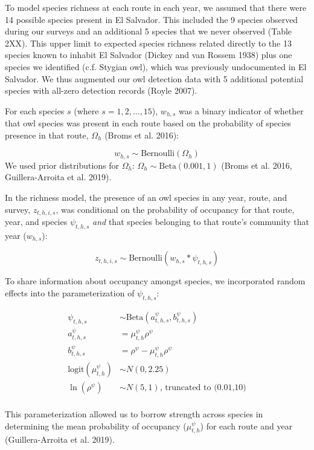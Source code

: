 \documentclass[
]{article}
\begin{document}
To model species richness at each route in each year, we assumed that
there were 14 possible species present in El Salvador. This included the
9 species observed during our surveys and an additional 5 species that
we never observed (Table 2XX). This upper limit to expected species
richness related directly to the 13 species known to inhabit El Salvador
(Dickey and van Rossem 1938) plus one species we identified (c.f.
Stygian owl), which was previously undocumented in El Salvador. We thus
augmented our owl detection data with 5 additional potential species
with all-zero detection records (Royle 2007).

For each species \(s\) (where \(s = 1,2, \ldots,15\)), \(w_{h,s}\) was a
binary indicator of whether that owl species was present in each route
based on the probability of species presence in that route, \(\Omega_h\)
(Broms et al. 2016):

\[
w_{h,s} \sim \text{Bernoulli}(\Omega_h)
\] We used prior distributions for \(\Omega_h\):
\(\Omega_h \sim \text{Beta}(0.001, 1)\) (Broms et al. 2016,
Guillera-Arroita et al. 2019).

In the richness model, the presence of an owl species in any year,
route, and survey, \(z_{t,h,i,s}\), was conditional on the probability
of occupancy for that route, year, and species \(\psi_{t,h,s}\)
\emph{and} that species belonging to that route's community that year
(\(w_{h,s}\)):

\[
z_{t,h,i,s} \sim \text{Bernoulli}(w_{h,s}*\psi_{t,h,s})
\]

To share information about occupancy amongst species, we incorporated
random effects into the parameterization of \(\psi_{t,h,s}\):

\[
\begin{aligned}
\psi_{t,h,s} &\sim \text{Beta}(a^\psi_{t,h,s},b^\psi_{t,h,s})\\ 
a^\psi_{t,h,s} &= \mu^\psi_{t,h}\rho^\psi\\
b^\psi_{t,h,s} &= \rho^\psi - \mu^\psi_{t,h}\rho^\psi\\
\text{logit}(\mu^\psi_{t,h}) &\sim N(0,2.25)\\
\ln(\rho^\psi) &\sim N(5,1)\text{, truncated to (0.01,10)}\\
\end{aligned}
\]

This parameterization allowed us to borrow strength across species in
determining the mean probability of occupancy (\(\mu^\psi_{t,h}\)) for
each route and year (Guillera-Arroita et al. 2019).
\end{document}
